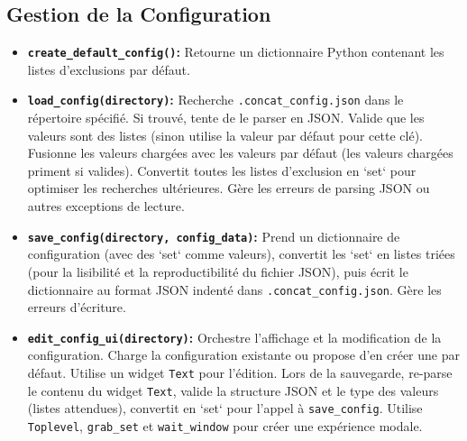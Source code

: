 \documentclass[11pt, a4paper]{article}
\begin{document}
\subsection{Gestion de la Configuration}
\begin{itemize}
    \item \textbf{\texttt{create\_default\_config()}:} Retourne un dictionnaire Python contenant les listes d'exclusions par défaut.
    \item \textbf{\texttt{load\_config(directory)}:} Recherche \texttt{.concat\_config.json} dans le répertoire spécifié. Si trouvé, tente de le parser en JSON. Valide que les valeurs sont des listes (sinon utilise la valeur par défaut pour cette clé). Fusionne les valeurs chargées avec les valeurs par défaut (les valeurs chargées priment si valides). Convertit toutes les listes d'exclusion en `set` pour optimiser les recherches ultérieures. Gère les erreurs de parsing JSON ou autres exceptions de lecture.
    \item \textbf{\texttt{save\_config(directory, config\_data)}:} Prend un dictionnaire de configuration (avec des `set` comme valeurs), convertit les `set` en listes triées (pour la lisibilité et la reproductibilité du fichier JSON), puis écrit le dictionnaire au format JSON indenté dans \texttt{.concat\_config.json}. Gère les erreurs d'écriture.
    \item \textbf{\texttt{edit\_config\_ui(directory)}:} Orchestre l'affichage et la modification de la configuration. Charge la configuration existante ou propose d'en créer une par défaut. Utilise un widget \texttt{Text} pour l'édition. Lors de la sauvegarde, re-parse le contenu du widget \texttt{Text}, valide la structure JSON et le type des valeurs (listes attendues), convertit en `set` pour l'appel à \texttt{save\_config}. Utilise \texttt{Toplevel}, \texttt{grab\_set} et \texttt{wait\_window} pour créer une expérience modale.
\end{itemize}
\end{document}

